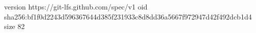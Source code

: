 version https://git-lfs.github.com/spec/v1
oid sha256:bf1f0d2243d596367644d385f231933c8d8dd36a5667f972947d42f492dcb1d4
size 82
